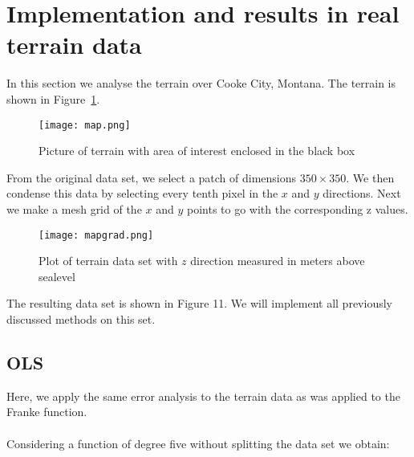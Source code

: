 \documentclass{emulateapj}
\begin{document}
\section{Implementation and results in real terrain data}
In this section we analyse the terrain over Cooke City, Montana.
The terrain is shown in Figure~\ref{maps}.
\begin{figure}[H]
    \centering
    \texttt{[image: map.png]}
    \caption{Picture of terrain with area of interest enclosed in the black box}
    \label{maps}
\end{figure}
From the original data set, we select a patch of dimensions $350\times350$. We then condense this data by selecting every tenth pixel in the $x$ and $y$ directions. Next we make a mesh grid of the $x$ and $y$ points to go with the corresponding z values.

\begin{figure}[H]
\centering
\caption{Plot of terrain data set with $z$ direction measured in meters above sealevel}
\texttt{[image: mapgrad.png]}
\label{maps1}
\end{figure}
The resulting data set is shown in Figure 11. We will implement all previously discussed methods on this set.
\subsection{OLS}
Here, we apply the same error analysis to the terrain data as was applied to the Franke function.\\
\\
Considering a function of degree five without splitting the data set we obtain: 
\end{document}
